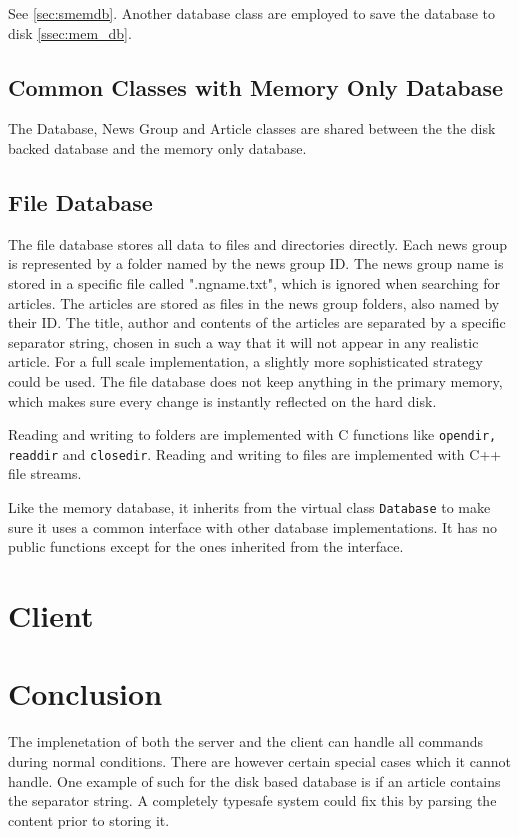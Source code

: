 \documentclass{acmsiggraph}               %
\begin{document}
See \ref{sec:smemdb}. Another database class are employed to save the
database to disk \ref{ssec:mem_db}.

\subsection{Common Classes with Memory Only Database}
\label{ssec:common_classes}
The Database, News Group and Article classes are shared between the the disk backed database
and the memory only database.

\subsection{File Database}
\label{ssec:file_db}
The file database stores all data to files and directories directly. Each news group is represented
by a folder named by the news group ID. The news group name is stored in a specific file called ".ngname.txt",
which is ignored when searching for articles. The articles are stored as files in the news group folders, 
also named by their ID. The title, author and contents of the articles are separated by a specific separator
string, chosen in such a way that it will not appear in any realistic article. For a full scale implementation, a
slightly more sophisticated strategy could be used. The file database does not keep anything in the primary memory, 
which makes sure every change is instantly reflected on the hard disk. 

Reading and writing to folders are implemented with C functions like \texttt{opendir, readdir} and \texttt{closedir}.
Reading and writing to files are implemented with C++ file streams. 

Like the memory database, it inherits from the virtual class \texttt{Database} to make sure it uses a common 
interface with other database implementations. It has no public functions except for the ones inherited
from the interface.


\section{Client}
\label{sec:client}

\section{Conclusion}
\label{sec:concl}
The implenetation of both the server and the client can handle all commands during
normal conditions. There are however certain special cases which it cannot handle. One
example of such for the disk based database is if an article contains the separator
string. A completely typesafe system could fix this by parsing the content prior to
storing it. 
\end{document}

